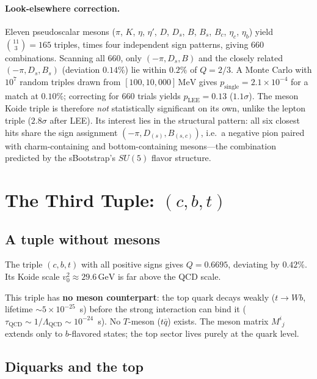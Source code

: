\documentclass[12pt,a4paper]{article}
\newcommand{\MeV}{\,\text{MeV}}
\newcommand{\GeV}{\,\text{GeV}}
\begin{document}
\paragraph{Look-elsewhere correction.}
Eleven pseudoscalar mesons ($\pi$, $K$, $\eta$, $\eta'$, $D$,
$D_s$, $B$, $B_s$, $B_c$, $\eta_c$, $\eta_b$) yield
$\binom{11}{3} = 165$ triples, times
four independent sign patterns, giving 660 combinations.
Scanning all 660, only $(-\pi, D_s, B)$ and the closely related
$(-\pi, D_s, B_s)$ (deviation $0.14\%$) lie within $0.2\%$ of
$Q = 2/3$. A Monte Carlo with $10^7$ random triples drawn
from $[100,10{,}000]\MeV$ gives $p_{\text{single}} = 2.1 \times 10^{-4}$
for a match at $0.10\%$; correcting for 660 trials yields
$p_{\text{LEE}} = 0.13$ ($1.1\sigma$). The meson Koide triple
is therefore \emph{not} statistically significant on its own,
unlike the lepton triple ($2.8\sigma$ after LEE). Its interest
lies in the structural pattern: all six closest hits share the
sign assignment $(-\pi, D_{(s)}, B_{(s,c)})$, i.e.\ a negative
pion paired with charm-containing and bottom-containing mesons---the
combination predicted by the sBootstrap's $SU(5)$ flavor structure.

\section{The Third Tuple: $(c, b, t)$}
\label{sec:cbt}

\subsection{A tuple without mesons}

The triple $(c, b, t)$ with all positive signs gives $Q = 0.6695$, 
deviating by $0.42\%$. Its Koide scale $v_0^2 \approx 29.6\GeV$ 
is far above the QCD scale.

This triple has \textbf{no meson counterpart}: the top quark decays 
weakly ($t \to Wb$, lifetime $\sim 5 \times 10^{-25}$~s) before the 
strong interaction can bind it ($\tau_{\text{QCD}} \sim 1/\Lambda_{\text{QCD}} 
\sim 10^{-24}$~s). No $T$-meson ($t\bar{q}$) exists. The meson matrix 
$M^i{}_j$ extends only to $b$-flavored states; the top sector lives 
purely at the quark level.

\subsection{Diquarks and the top}
\end{document}
